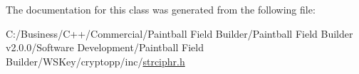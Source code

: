 The documentation for this class was generated from the following file:\begin{DoxyCompactItemize}
\item 
C:/Business/C++/Commercial/Paintball Field Builder/Paintball Field Builder v2.0.0/Software Development/Paintball Field Builder/WSKey/cryptopp/inc/\hyperlink{strciphr_8h}{strciphr.h}\end{DoxyCompactItemize}
